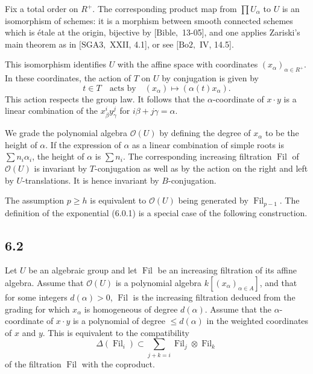 \documentclass[11pt]{article}
\providecommand{\Fil}{\operatorname{Fil}}
\providecommand{\OO}{\mathcal O}
\begin{document}
Fix a total order on \(R^+\). The corresponding product map from
\(\prod U_\alpha\) to \(U\) is an isomorphism of schemes: it is a morphism between smooth
connected schemes which is étale at the origin, bijective by \([\mathrm{Bible},\) 13-05],
and one applies Zariski's main theorem as in \([\mathrm{SGA3},\) XXII, 4.1], or see
\([\mathrm{Bo2},\) IV, 14.5].

This isomorphism identifies \(U\) with the affine space with coordinates
\((x_\alpha)_{\alpha\in R^+}\). In these coordinates, the action of \(T\) on \(U\) by
conjugation is given by
\[
  t\in T\quad\text{acts by}\quad (x_\alpha)\longmapsto(\alpha(t)x_\alpha).
\]
This action respects the group law. It follows that the \(\alpha\)-coordinate of
\(x\cdot y\) is a linear combination of the \(x_\beta^i y_\gamma^j\) for
\(i\beta+j\gamma=\alpha\).

We grade the polynomial algebra \(\mathcal O(U)\) by defining the degree of \(x_\alpha\)
to be the height of \(\alpha\). If the expression of \(\alpha\) as a linear combination of
simple roots is \(\sum n_i\alpha_i\), the height of \(\alpha\) is \(\sum n_i\). The
corresponding increasing filtration \(\Fil\) of \(\mathcal O(U)\) is invariant by
\(T\)-conjugation as well as by the action on the right and left by \(U\)-translations.
It is hence invariant by \(B\)-conjugation.

The assumption \(p\ge h\) is equivalent to \(\mathcal O(U)\) being generated by
\(\Fil_{p-1}\). The definition of the exponential (6.0.1) is a special case of the
following construction.


\subsection*{6.2}
Let \(U\) be an algebraic group and let \(\Fil\) be an increasing filtration of its affine algebra. Assume that
\(\OO(U)\) is a polynomial algebra \(k[(x_\alpha)_{\alpha\in A}]\), and that for some integers
\(d(\alpha)>0\), \(\Fil\) is the increasing filtration deduced from the grading for which
\(x_\alpha\) is homogeneous of degree \(d(\alpha)\). Assume that the \(\alpha\)-coordinate of
\(x\cdot y\) is a polynomial of degree \(\le d(\alpha)\) in the weighted coordinates of \(x\) and
\(y\). This is equivalent to the compatibility
\begin{equation}
  \Delta(\Fil_i)\subset \sum_{j+k=i}\Fil_j\otimes\Fil_k
  \tag{6.2.1}
\end{equation}
of the filtration \(\Fil\) with the coproduct.
\end{document}
